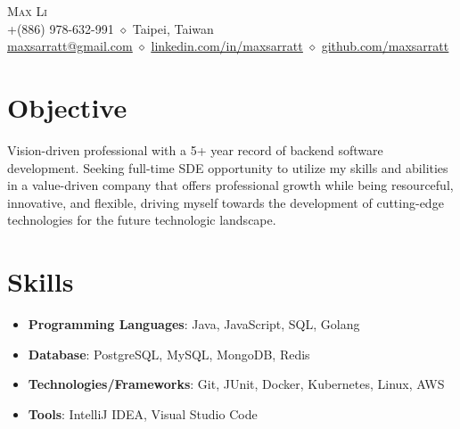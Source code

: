 \documentclass[letterpaper,11pt]{article}
\newcommand{\resumeItemTwo}[2]{
  \item{
    \textbf{#1}{: \small #2 \vspace{-2pt}}
  }
}
\newcommand{\resumeSubItem}[2]{\resumeItemTwo{#1}{#2}\vspace{-4pt}}
\newcommand{\resumeSubHeadingListStart}{\begin{itemize}[leftmargin=0.0in, label={}]}
\newcommand{\resumeSubHeadingListEnd}{\end{itemize}}
\begin{document}
\begin{center}
    {\Huge \scshape Max Li} \\ \vspace{4pt}
    +(886) 978-632-991 {$\diamond$} Taipei, Taiwan \\ \vspace{4pt} \href{mailto:maxsarratt@gmail.com}{\underline{maxsarratt@gmail.com}} {$\diamond$} \href{https://www.linkedin.com/in/maxsarratt/}{\underline{linkedin.com/in/maxsarratt}} {$\diamond$} \href{https://github.com/maxsarratt}{\underline{github.com/maxsarratt}}
    \vspace{-8pt}
\end{center}

\section{Objective}
  \begin{flushleft}
    {Vision-driven professional with a 5+ year record of backend software development. Seeking full-time SDE opportunity to utilize my skills and abilities in a value-driven company that offers professional growth while being resourceful, innovative, and flexible, driving myself towards the development of cutting-edge technologies for the future technologic landscape.}
  \end{flushleft}
  
\section{Skills}
  \resumeSubHeadingListStart
    \resumeSubItem{Programming Languages}
      {Java, JavaScript, SQL, Golang}
    \resumeSubItem{Database}
      {PostgreSQL, MySQL, MongoDB, Redis}
    \resumeSubItem{Technologies/Frameworks}
      {Git, JUnit, Docker, Kubernetes, Linux, AWS}
      \resumeSubItem{Tools}
        {IntelliJ IDEA, Visual Studio Code}
  \resumeSubHeadingListEnd
\end{document}
